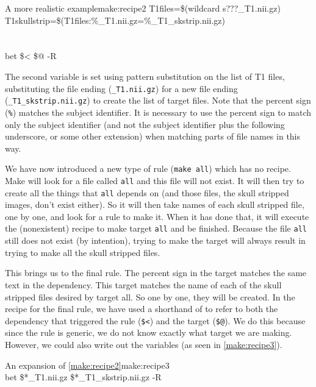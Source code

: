 \begin{make}{A more realistic example}{make:recipe2}
	T1files=\$(wildcard s???_T1.nii.gz) \\
	T1skullstrip=\$(T1files:\%_T1.nii.gz=\%_T1_skstrip.nii.gz) \\
	 \\
		
	\\
	\tab bet \$< \$@ -R
\end{make}
	
The second variable is set using pattern substitution on the list of T1 files, substituting the file ending (\texttt{_T1.nii.gz}) for a new file ending (\texttt{_T1_skstrip.nii.gz}) to create the list of target files. Note that the percent sign (\texttt{\%}) matches the subject identifier. It is necessary to use the percent sign to match only the subject identifier (and not the subject identifier plus the following underscore, or some other extension) when matching parts of file names in this way. 
	
We have now introduced a new type of rule (\texttt{make all}) which has no recipe. Make will look for a file called \texttt{all} and this file will not exist. It will then try to create all the things that \texttt{all} depends on (and those files, the skull stripped images, don't exist either). So it will then take names of each skull stripped file, one by one, and look for a rule to make it. When it has done that, it will execute the (nonexistent) recipe to make target \texttt{all} and be finished. Because the file \texttt{all} still does not exist (by intention), trying to make the target will always result in trying to make all the skull stripped files.
	
This brings us to the final rule. The percent sign in the target matches the same text in the dependency. This target matches the name of each of the skull stripped files desired by target all. So one by one, they will be created. In the recipe for the final rule, we have used a shorthand of \maken{} to refer to both the dependency that triggered the rule (\texttt{\$<}) and the target (\texttt{\$@}). We do this because since the rule is generic, we do not know exactly what target we are making. However, we could also write out the variables (as seen in \autoref{make:recipe3}).
	
\begin{make}{An expansion of \autoref{make:recipe2}}{make:recipe3}
	 \\
	\tab bet \$*_T1.nii.gz \$*_T1_skstrip.nii.gz -R
\end{make}
	
